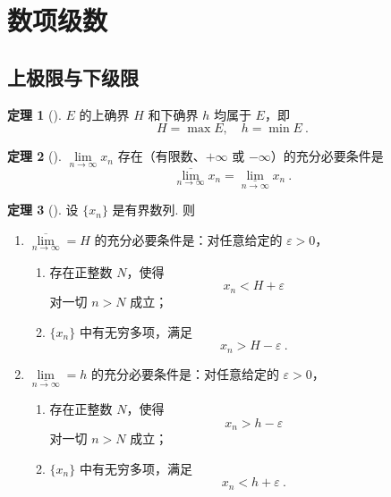 \documentclass[zihao=-4,linespread=1.8,UTF8,nothm]{aytony_base}
\theoremstyle{definition}
\newtheorem{theorem}{\indent\heiti\textbf{定理}}[subsection]
\begin{document}
\setcounter{section}{8}
\section{数项级数}

\setcounter{subsection}{1}
\subsection{上极限与下级限}

\begin{theorem}[]
    $E$ 的上确界 $H$ 和下确界 $h$ 均属于 $E$，即 $$
        H = \max E,\quad h = \min E\ .
    $$
\end{theorem}

\begin{theorem}[]
    $\lim\limits_{n \to \infty} x_n$ 存在（有限数、$+\infty$ 或 $-\infty$）的充分必要条件是 $$
        \underset{n \to \infty}{\overline{\lim}} x_n = \underset{n \to \infty}{\underline{\lim}} x_n\ .
    $$
\end{theorem}

\begin{theorem}[]
    设 $\{x_n\}$ 是有界数列. 则
    \begin{enumerate}
        \item $\underset{n \to \infty}{\overline{\lim}}  = H$ 的充分必要条件是：对任意给定的 $\varepsilon > 0$，
              \begin{enumerate}
                  \item 存在正整数 $N$，使得 $$
                            x_n < H + \varepsilon
                        $$ 对一切 $n > N$ 成立；
                  \item $\{x_n\}$ 中有无穷多项，满足 $$
                            x_n > H - \varepsilon\ .
                        $$
              \end{enumerate}
        \item $\underset{n \to \infty}{\underline{\lim}}  = h$ 的充分必要条件是：对任意给定的 $\varepsilon > 0$，
              \begin{enumerate}
                  \item 存在正整数 $N$，使得 $$
                            x_n > h - \varepsilon
                        $$ 对一切 $n > N$ 成立；
                  \item $\{x_n\}$ 中有无穷多项，满足 $$
                            x_n < h+ \varepsilon\ .
                        $$
              \end{enumerate}
    \end{enumerate}
\end{theorem}
\end{document}
